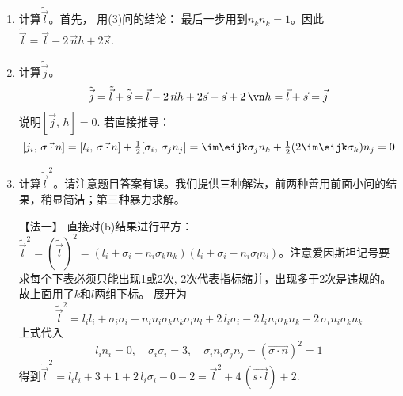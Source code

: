 \begin{enumerate}[label=\textbf{6.\arabic*}, listparindent=\parindent]
\begin{enumerate}
    \item 计算$\tilde{\vec{l}}$。首先，
    用(3)问的结论：
    最后一步用到$n_kn_k=1$。因此$\tilde{\vec{l}}=\vec{l}-2\,\vec{n}h+2\vec{s}$.
    \item 计算$\tilde{\vec{j}}$。
    \[\tilde{\vec{j}}=\tilde{\vec{l}}+\tilde{\vec{s}}= \vec{l}-2\,\vec{n}h+2\vec{s}-\vec{s}+2\,\vn h =\vec{l}+\vec{s}= \vec{j}\]
    说明$[\vec{j},\,h]=0$.
    若直接推导：
    \[[j_i,\,\vec{\sigma\cdot n}]=[l_i,\,\vec{\sigma\cdot n}]+\tfrac{1}{2}[\sigma_i,\,\sigma_jn_j]=\im\eijk\sigma_jn_k+\tfrac{1}{2}(2\im\eijk\sigma_k)n_j = 0\]
    
    \item 计算$\tilde{\vec{l}}^2$。{\color{red}请注意题目答案有误。}我们提供三种解法，前两种善用前面小问的结果，稍显简洁；第三种暴力求解。
    
    【法一】
    直接对(b)结果进行平方：$\tilde{\vec{l}}^2=(\tilde{\vec{l}})^2=(l_i+\sigma_i-n_i\sigma_kn_k)(l_i+\sigma_i-n_i\sigma_ln_l)$。注意爱因斯坦记号要求每个下表必须只能出现1或2次, 2次代表指标缩并，出现多于2次是违规的。故上面用了$k$和$l$两组下标。
    展开为
    \[\tilde{\vec{l}}^2 = l_il_i+\sigma_i\sigma_i+ n_in_i\sigma_kn_k\sigma_ln_l+
    2\,l_i\sigma_i-2\,l_in_i\sigma_kn_k - 2\,\sigma_in_i\sigma_kn_k \]
    上式代入
    \[l_in_i=0,\quad \sigma_i\sigma_i = 3,\quad\sigma_in_i\sigma_jn_j=(\vec{\sigma\cdot n})^2=1\]
    得到$\tilde{\vec{l}}^2=l_il_i+3+1+2\,l_i\sigma_i-0-2 = \vec{l}^2+4\,(\vec{s\cdot l})+2$.
    

\end{enumerate}
\end{enumerate}
